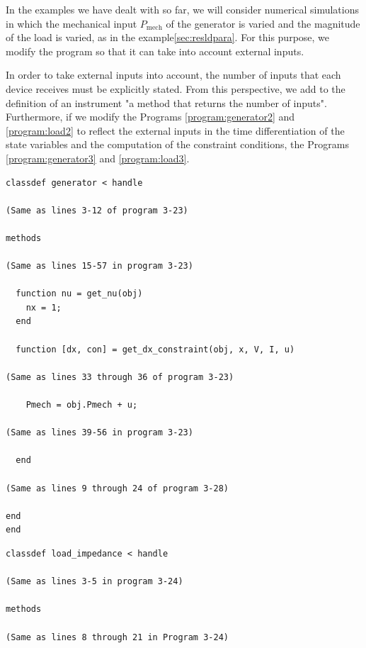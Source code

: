\documentclass[tombow,dvipdfmx]{corona-a5-1.1}
\begin{document}
\begin{例}
In the examples we have dealt with so far, we will consider numerical simulations in which the mechanical input $P_\mathrm{mech}$ of the generator is varied and the magnitude of the load is varied, as in the example\ref{sec:resldpara}.
For this purpose, we modify the program so that it can take into account external inputs.

In order to take external inputs into account, the number of inputs that each device receives must be explicitly stated.
From this perspective, we add to the definition of an instrument "a method that returns the number of inputs".
Furthermore, if we modify the Programs \ref{program:generator2} and \ref{program:load2} to reflect the external inputs in the time differentiation of the state variables and the computation of the constraint conditions, the Programs \ref{program:generator3} and \ref{program:load3}.

\smallskip
\begin{PROGRAMA}[count,title={generator.m}]\label{program:generator3}
  \begin{verbatim}
classdef generator < handle
  
(Same as lines 3-12 of program 3-23)

methods

(Same as lines 15-57 in program 3-23)

  function nu = get_nu(obj)
    nx = 1;
  end

  function [dx, con] = get_dx_constraint(obj, x, V, I, u)
    
(Same as lines 33 through 36 of program 3-23)

    Pmech = obj.Pmech + u;

(Same as lines 39-56 in program 3-23)

  end

(Same as lines 9 through 24 of program 3-28)

end
end
\end{verbatim}
\end{PROGRAMA}

\begin{PROGRAMA}[count,title={load\_impedance.m}]\label{program:load3}
\begin{verbatim}
classdef load_impedance < handle
  
(Same as lines 3-5 in program 3-24)

methods

(Same as lines 8 through 21 in Program 3-24)
  

\end{verbatim}
\end{PROGRAMA}
\end{例}
\end{document}

